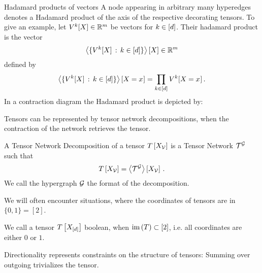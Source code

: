 \begin{example}{Hadamard products of vectors}\label{exa:hadamard}
	A node appearing in arbitrary many hyperedges denotes a Hadamard product of the axis of the respective decorating tensors.
	To give an example, let $V^{k}[X]\in\mathbb{R}^m$ be vectors for $k\in[d]$. Their hadamard product is the vector
		\[ \left\langle \{V^{k}[X] \, : \, k\in[d]\}\right\rangle \left[ X \right]  \in \mathbb{R}^m \]
	defined by
		\[ \left\langle \{V^{k}[X] \, : \, k\in[d]\}\right\rangle \left[ X_{}=x_{} \right]
		= \prod_{k\in[d]} V^{k}[X_{}=x_{}]\, . \]
	In a contraction diagram the Hadamard product is depicted by: %
	\begin{center}
		
	\end{center}
\end{example}




Tensors can be represented by tensor network decompositions, when the contraction of the network retrieves the tensor.

\begin{definition}\label{def:tnDecomposition}
	A Tensor Network Decomposition of a tensor $T\left[X_{\mathcal{V}}\right]$ is a Tensor Network $\mathcal{T}^{\mathcal{G}}$ such that
		\[ T\left[X_{\mathcal{V}}\right]= \left\langle \mathcal{T}^{\mathcal{G}}\right\rangle \left[ X_{\mathcal{V}} \right] \, . \]
	We call the hypergraph $\mathcal{G}$ the format of the decomposition.
\end{definition}




We will often encounter situations, where the coordinates of tensors are in $\{0,1\}=[2]$.

\begin{definition}\label{def:booleanTensor} %
	We call a tensor $T\left[X_{[d]}\right]$ boolean, when $\mathrm{im}\left(T\right)\subset[2]$, i.e. all coordinates are either $0$ or $1$.
\end{definition}

Directionality represents constraints on the structure of tensors:
Summing over outgoing trivializes the tensor.

